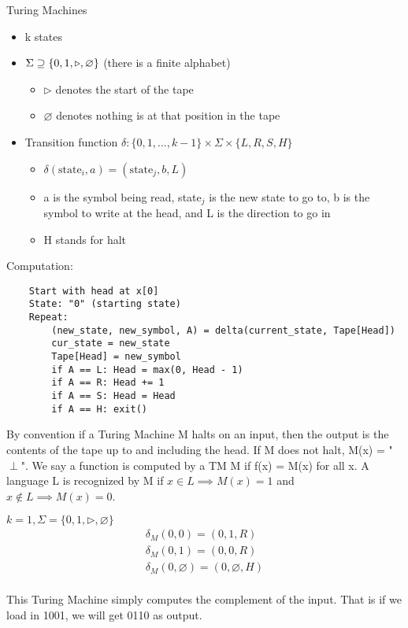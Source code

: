 \begin{definition}
    Turing Machines

    \begin{itemize}
        \item k states
        \item $\Sigma \supseteq \{ 0, 1, \triangleright, \null \varnothing \}$ (there is a finite alphabet)
        \begin{itemize}
            \item $\triangleright$ denotes the start of the tape
            \item $\varnothing$ denotes nothing is at that position in the tape
        \end{itemize}
        \item Transition function $\delta: \{0, 1, ..., k - 1 \} \times \Sigma \times \{ L, R, S, H \}$
        \begin{itemize}
            \item $\delta(\text{state}_i, a) = (\text{state}_j, b, L)$
            \item a is the symbol being read, state$_j$ is the new state to go to, b is the symbol to write at the head, and L is the direction to go in
            \item H stands for halt
        \end{itemize}
    \end{itemize}
\end{definition}

Computation:
\begin{verbatim}
    Start with head at x[0]
    State: "0" (starting state)
    Repeat:
        (new_state, new_symbol, A) = delta(current_state, Tape[Head])
        cur_state = new_state
        Tape[Head] = new_symbol
        if A == L: Head = max(0, Head - 1)
        if A == R: Head += 1
        if A == S: Head = Head
        if A == H: exit()
\end{verbatim}

By convention if a Turing Machine M halts on an input, then the output is the contents of the tape up to and including the head. If M does not halt, M(x) = "$\perp$". We say a function is computed by a TM M if f(x) = M(x) for all x. A language L is recognized by M if $x \in L \implies M(x) = 1$ and $x \notin L \implies M(x) = 0$.

\begin{example}
    
    $ k = 1, \Sigma = \{0, 1, \triangleright, \varnothing \}$
    \begin{gather*}
        \delta_M(0, 0) = (0, 1, R) \\
        \delta_M(0, 1) = (0, 0, R) \\ 
        \delta_M(0, \varnothing) = (0, \varnothing, H) \\
    \end{gather*}

    This Turing Machine simply computes the complement of the input. That is if we load in 1001, we will get 0110 as output. 

\end{example}


